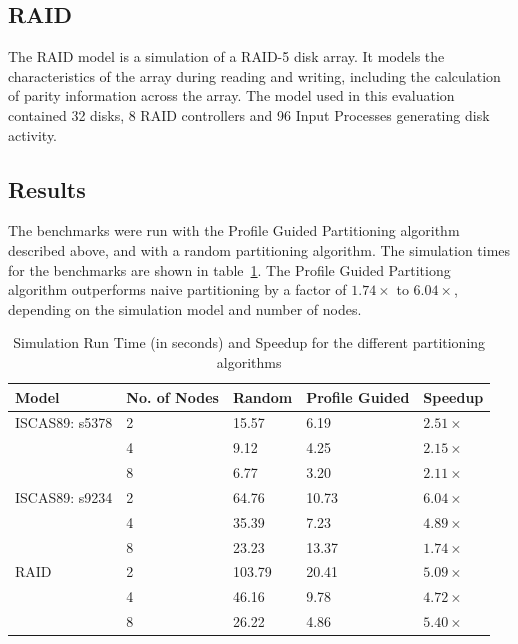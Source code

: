 \documentclass{wscpaperproc}
\begin{document}
\subsection{RAID}
The RAID model is a simulation of a RAID-5 disk array. It models the characteristics of the array during reading and writing, including the calculation of parity information across the array. The model used in this evaluation contained 32 disks, 8 RAID controllers and 96 Input Processes generating disk activity.

\subsection{Results}

The benchmarks were run with the Profile Guided Partitioning algorithm described above, and with a random partitioning algorithm. The simulation times for the benchmarks are shown in table~\ref{table:benchmarks}. The Profile Guided Partitiong algorithm outperforms naive partitioning by a factor of \(1.74\times\) to \(6.04\times\), depending on the simulation model and number of nodes.

\begin{table}[h]
\centering
\begin{tabular}{@{}lllll@{}}
\toprule
Model          & No. of Nodes & Random & Profile Guided & Speedup       \\ \midrule
ISCAS89: s5378 & 2            & 15.57  & 6.19           & \(2.51\times\)    \\
               & 4            & 9.12   & 4.25           & \(2.15\times\)    \\
               & 8            & 6.77   & 3.20           & \(2.11\times\)    \\ \midrule
ISCAS89: s9234 & 2            & 64.76  & 10.73          & \(6.04\times\)    \\
               & 4            & 35.39  & 7.23           & \(4.89\times\)    \\
               & 8            & 23.23  & 13.37          & \(1.74\times\)    \\ \midrule
RAID           & 2            & 103.79 & 20.41          & \(5.09\times\)    \\
               & 4            & 46.16  & 9.78           & \(4.72\times\)    \\
               & 8            & 26.22  & 4.86           & \(5.40\times\)    \\ \bottomrule
\end{tabular}
\caption{Simulation Run Time (in seconds) and Speedup for the different partitioning algorithms}
\label{table:benchmarks}
\end{table}
\end{document}
